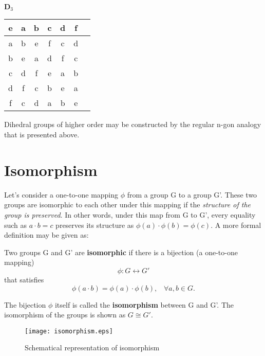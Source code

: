 \begin{table} [H]
\center
 $\mathbf{D}_3$\\
\begin{tabular}{c||cccccc} 
     e & a & b & c & d & f  \\ 
    \hline 
     a & b & e & f & c & d  \\ 
     b & e & a & d & f & c  \\ 
     c & d & f & e & a & b  \\ 
     d & f & c & b & e & a  \\ 
     f & c & d & a & b & e  \\ 

\end{tabular} 
\end{table} 

Dihedral groups of higher order may be constructed by the regular n-gon analogy that is presented above.

\section{Isomorphism}
\label{isomorphism}

Let's consider a one-to-one mapping $\phi$ from a group G to a group G'. These two groups are isomorphic to each other under this mapping if the \textit{structure of the group is preserved}. In other words, under this map from G to G', every equality such as $a\cdot b = c$ preserves its structure as $\phi(a) \cdot \phi(b) = \phi(c)$. A more formal definition may be given as:
\cite{rosen_symmetry_1995,armstrong_groups_1988}

\begin{definition}[Isomorphism]
\label{def:isomorphism}
Two groups G and G' are \textbf{isomorphic} if there is a bijection (a one-to-one mapping)\cite{armstrong_groups_1988}
\[\phi: G \longleftrightarrow G' \]
 that satisfies
\[\phi(a\cdot b) = \phi(a)\cdot \phi(b) ,\;\;\; \forall a,b \in G.\]

The bijection $\phi$ itself is called the \textbf{isomorphism} between G and G'. The isomorphism of the groups is shown as $G \cong G'$.


\end{definition}

\begin{figure}[H]
\center
\texttt{[image: isomorphism.eps]}
\caption{Schematical representation of isomorphism}
\end{figure}
%
